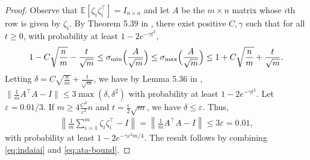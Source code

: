 \documentclass[12pt]{article}
\newcommand{\1}{\mathbbm{1}}
\newcommand{\eps}{\varepsilon}
\newcommand{\zetaizetai}{\zeta_i \zeta_i^\intercal}
\newcommand{\sigmin}{\sigma_\text{min}}
\newcommand{\sigmax}{\sigma_\text{max}}
\begin{document}
\begin{proof}
Observe that $\mathbb{E} [\zetaizetai] = I_{n \times n}$ and let $A$ be the $m \times n$ matrix whose $i$th row is given by $\zeta_i$.   By Theorem 5.39 in \cite{V2012}, there exist positive $C, \gamma$ such that for all $t \geq 0$, with probability at least $1 - 2e^{-\gamma t^2}$, 
\begin{align}
1 - C\sqrt{\frac{n}{m}} - \frac{t}{\sqrt{m}} \leq \sigmin \Bigl(\frac{A}{\sqrt{m}} \Bigr)  \leq  \sigmax \Bigl(\frac{A}{\sqrt{m}} \Bigr)  \leq 1 + C\sqrt{\frac{n}{m}} + \frac{t}{\sqrt{m}}. \notag
 \end{align}
Letting $\delta = C \sqrt{\frac{n}{m}} + \frac{t}{\sqrt{m}}$, we have by Lemma 5.36 in \cite{V2012}, $\|\frac{1}{m} A^\intercal A - I \| \leq 3 \max(\delta, \delta^2)$ with probability at least $1 - 2e^{-\gamma t^2}$. Let $\eps = 0.01/3$.  If $m \geq 4 \frac{C^2}{\eps^2} n$ and $t = \frac{\eps}{2}\sqrt{m}$, we have $\delta \leq \eps$.  Thus, 
\begin{align}
\left \|  \frac{1}{m} \sum_{i=1}^m \zetaizetai - I  \right \| =  \left \|  \frac{1}{m} A^\intercal A - I  \right \| \leq  3 \eps = 0.01, \label{eq:ata-bound}
\end{align}
with probability at least $1 -2 e^{-\gamma  \eps^2 m/4}$. 
The result follows by combining  \eqref{eq:indaiai} and \eqref{eq:ata-bound}.
\end{proof}
\end{document}
